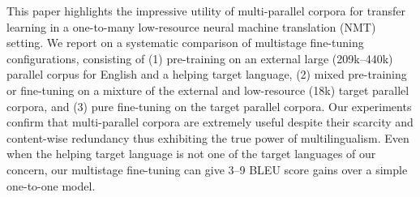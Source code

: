 This paper highlights the impressive utility of multi-parallel corpora for transfer learning in a one-to-many low-resource neural machine translation (NMT) setting. We report on a systematic comparison of multistage fine-tuning configurations, consisting of (1) pre-training on an external large (209k--440k) parallel corpus for English and a helping target language, (2) mixed pre-training or fine-tuning on a mixture of the external and low-resource (18k) target parallel corpora, and (3) pure fine-tuning on the target parallel corpora. Our experiments confirm that multi-parallel corpora are extremely useful despite their scarcity and content-wise redundancy thus exhibiting the true power of multilingualism. Even when the helping target language is not one of the target languages of our concern, our multistage fine-tuning can give 3--9 BLEU score gains over a simple one-to-one model.